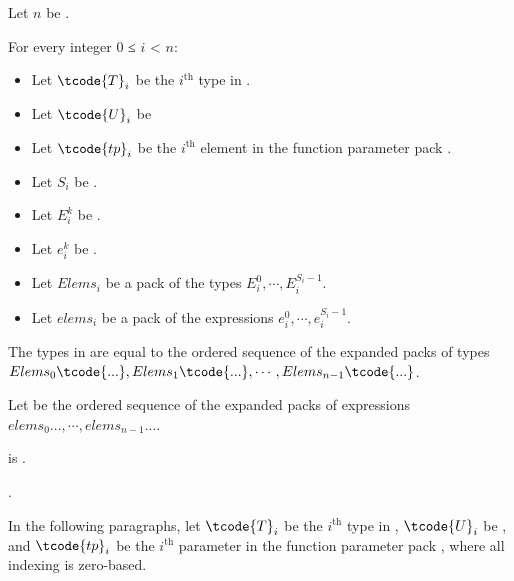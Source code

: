 \documentclass{wg21}
\begin{document}
\begin{itemdescr}  %
    \pnum
    \begin{addedblock}

    Let $n$ be .

    For every integer $0$ ≤ $i$ < $n$:
        \begin{itemize}
         \item Let $\tcode{T}_i$ be the $i^\text{th}$ type in .
         \item Let $\tcode{U}_i$ be 
         \item Let $\tcode{tp}_i$ be the $i^\text{th}$ element in the function parameter pack .
         \item Let $S_i$ be .
         \item Let $E_i^k$ be .
         \item Let $e_i^k$ be .
         \item Let $Elems_i$ be a pack of the types $E_i^0, \cdots,  E_i^{S_i-1}$.
         \item Let $elems_i$ be a pack of the expressions $e_i^0, \cdots,  e_i^{S_i-1}$.
     \end{itemize}

    The types in  are equal to the ordered
    sequence of the expanded packs of types \\
    $Elems_0\tcode{...} , Elems_1\tcode{...} , \cdots , Elems_{n-1}\tcode{...}$.

    Let  be the ordered sequence of the expanded packs of expressions $elems_0..., \cdots, elems_{n-1}...$.

\mandates {} is .

\returns
    .
    \end{addedblock}
    \begin{removedblock}



    In the following paragraphs, let $\tcode{T}_i$ be the $i^\text{th}$ type in ,
    $\tcode{U}_i$ be , and $\tcode{tp}_i$ be the $i^\text{th}$
    parameter in the function parameter pack , where all indexing is
    zero-based.


\end{removedblock}
\end{itemdescr}
\end{document}

